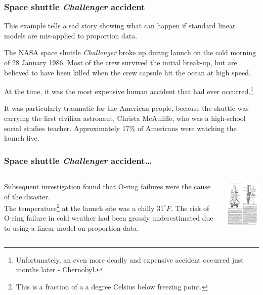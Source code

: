 \documentclass{beamer}\usepackage[]{graphicx}\usepackage[]{xcolor}
\begin{document}


\begin{frame}
\frametitle{Space shuttle {\em Challenger} accident}
This example tells a sad story showing what can happen if standard linear models are
mis-applied to proportion data.

\medskip
The NASA space shuttle {\em Challenger} broke up during launch on the 
cold morning of 28 January 1986. 
Most of the crew survived the initial break-up, 
but are believed to have been killed when the crew capsule hit the ocean
at high speed.

\medskip
At the time, it was the most expensive human accident that had ever occurred.\footnote{Unfortunately, an even more deadly and expensive accident occurred just months later - Chernobyl.}

\medskip
It was particularly traumatic for the American people,
because the shuttle was carrying the first civilian astronaut, Christa McAuliffe,
who was a high-school social studies teacher.
Approximately 17\% of Americans were watching the launch live.
\end{frame}



\begin{frame}
\frametitle{Space shuttle {\em Challenger} accident\ldots}
\begin{columns}
\begin{column}{0.6\textwidth}

{\color{black} Subsequent investigation found that O-ring failures were the cause of the disaster. \\[3mm]

The temperature\footnote{This is a fraction of a a degree Celsius below freezing point.} at the launch site was a chilly $31^{\circ}F$.
The risk of O-ring failure in cold weather had been grossly underestimated due to 
using a linear model on proportion data.}
\end{column}

\begin{column}{0.4\textwidth}
\includegraphics[width=1.8in]{Figures/ShuttleSketch}
\end{column}
\end{columns}
\end{frame}
\end{document}
